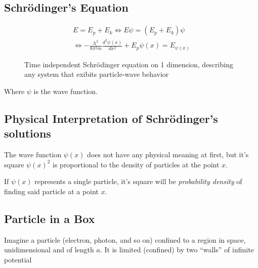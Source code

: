 \documentclass{article}[10pt]
\begin{document}
\subsection{Schrödinger's Equation}
\begin{figure}[H]
    \centering
    \begin{align*}
        E = E_p + E_k \iff E\psi = (E_p + E_k)\psi \\
        \iff -\frac{h^2}{8\pi^2 m}\frac{d^2\psi(x)}{dx^2} + E_p\psi(x) = E_{\psi(x)}
    \end{align*}
    \caption*{Time independent Schrödinger equation on 1 dimension, describing any system that exibits particle-wave behavior}
\end{figure}

Where $\psi$ is the wave function.
\subsection{Physical Interpretation of Schrödinger's solutions}

The wave function $\psi(x)$ does not have any physical meaning at first, but
it's square $\psi{(x)}^2$ is proportional to the density of particles at the point
$x$.

If $\psi(x)$ represents a single particle, it's square will be \emph{probability density}
of finding said particle at a point $x$.

\subsection{Particle in a Box}
Imagine a particle (electron, photon, and so on) confined to a region in space,
unidimensional and of length $a$. It is limited (confined) by two ``walls'' of
infinite potential
\end{document}
